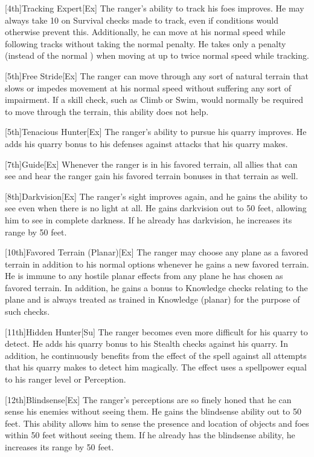 [4th]{Tracking Expert}[Ex]
The ranger's ability to track his foes improves.
He may always take 10 on Survival checks made to track, even if conditions would otherwise prevent this.
Additionally, he can move at his normal speed while following tracks without taking the normal  penalty.
He takes only a  penalty (instead of the normal ) when moving at up to twice normal speed while tracking.

[5th]{Free Stride}[Ex]
The ranger can move through any sort of natural terrain that slows or impedes movement at his normal speed without suffering any sort of impairment.
If a skill check, such as Climb or Swim, would normally be required to move through the terrain, this ability does not help.

[5th]{Tenacious Hunter}[Ex]
The ranger's ability to pursue his quarry improves.
He adds his quarry bonus to his defenses against attacks that his quarry makes.

[7th]{Guide}[Ex]
Whenever the ranger is in his favored terrain, all allies that can see and hear the ranger gain his favored terrain bonuses in that terrain as well.

[8th]{Darkvision}[Ex]
The ranger's sight improves again, and he gains the ability to see even when there is no light at all.
He gains darkvision out to 50 feet, allowing him to see in complete darkness.
If he already has darkvision, he increases its range by 50 feet.

[10th]{Favored Terrain (Planar)}[Ex]
The ranger may choose any plane as a favored terrain in addition to his normal options whenever he gains a new favored terrain.
He is immune to any hostile planar effects from any plane he has chosen as favored terrain.
In addition, he gains a  bonus to Knowledge checks relating to the plane and is always treated as trained in Knowledge (planar) for the purpose of such checks.

[11th]{Hidden Hunter}[Su]
The ranger becomes even more difficult for his quarry to detect.
He adds his quarry bonus to his Stealth checks against his quarry.
In addition, he continuously benefits from the effect of the  spell against all attempts that his quarry makes to detect him magically.
The effect uses a spellpower equal to his ranger level or Perception.

[12th]{Blindsense}[Ex]
The ranger's perceptions are so finely honed that he can sense his enemies without seeing them.
He gains the blindsense ability out to 50 feet.
This ability allows him to sense the presence and location of objects and foes within 50 feet without seeing them.
If he already has the blindsense ability, he increases its range by 50 feet.

